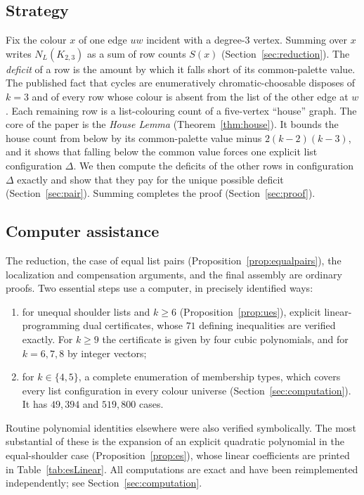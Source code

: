 \documentclass[11pt]{amsart}
\theoremstyle{definition}
\theoremstyle{remark}
\newcommand{\1}{\mathbf 1}
\begin{document}
\subsection*{Strategy}
Fix the colour $x$ of one edge $uw$ incident with a degree-$3$ vertex. Summing over $x$ writes
$N_L(K_{2,3})$ as a sum of row counts $S(x)$ (Section~\ref{sec:reduction}). The \emph{deficit} of a row
is the amount by which it falls short of its common-palette value. The published fact that cycles are
enumeratively chromatic-choosable disposes of $k=3$ and of every row whose colour is absent from the list
of the other edge at $w$. Each remaining row is a list-colouring count of a five-vertex ``house''
graph. The core of the paper is the \emph{House Lemma}
(Theorem~\ref{thm:house}). It bounds the house count from below by its common-palette value minus
$2(k-2)(k-3)$, and it shows that falling below the common value forces one explicit list
configuration $\Delta$. We then compute the deficits of the other rows in configuration $\Delta$
exactly and show that they pay for the unique possible deficit (Section~\ref{sec:pair}). Summing
completes the proof (Section~\ref{sec:proof}).

\subsection*{Computer assistance}
The reduction, the case of equal list pairs (Proposition~\ref{prop:equalpairs}), the localization and
compensation arguments, and the final assembly are ordinary proofs. Two essential steps use a
computer, in precisely identified ways:
\begin{enumerate}[label=(\alph*)]
\item for unequal shoulder lists and $k\ge 6$ (Proposition~\ref{prop:ues}), explicit
  linear-programming dual certificates, whose $71$ defining inequalities are verified exactly. For
  $k\ge9$ the certificate is given by four cubic polynomials, and for $k=6,7,8$ by integer vectors;
\item for $k\in\{4,5\}$, a complete enumeration of membership types, which covers every list
  configuration in every colour universe (Section~\ref{sec:computation}). It has $49{,}394$ and
  $519{,}800$ cases.
\end{enumerate}
Routine polynomial identities elsewhere were also verified symbolically. The most substantial of these is
the expansion of an explicit quadratic polynomial in the equal-shoulder case
(Proposition~\ref{prop:es}), whose linear coefficients are printed in Table~\ref{tab:esLinear}. All
computations are exact and have been reimplemented independently; see
Section~\ref{sec:computation}.
\end{document}
